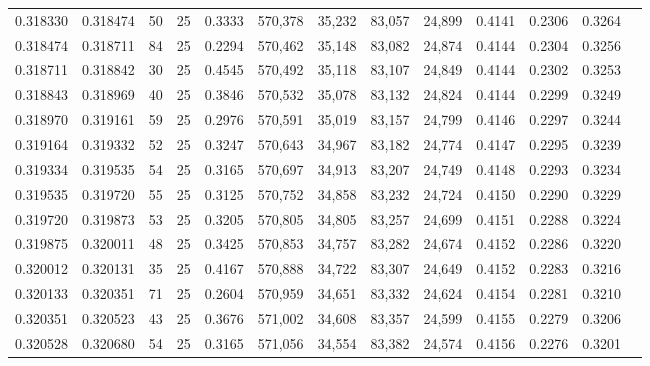 \begin{tabular}{rrrrrrrrrrrrr}
0.318330 & 0.318474 &    50 &  25 &                                     0.3333 & 570,378 &  35,232 &  83,057 &  24,899 & 0.4141 & 0.2306 & 0.3264 \\
0.318474 & 0.318711 &    84 &  25 &                                     0.2294 & 570,462 &  35,148 &  83,082 &  24,874 & 0.4144 & 0.2304 & 0.3256 \\
0.318711 & 0.318842 &    30 &  25 &                                     0.4545 & 570,492 &  35,118 &  83,107 &  24,849 & 0.4144 & 0.2302 & 0.3253 \\
0.318843 & 0.318969 &    40 &  25 &                                     0.3846 & 570,532 &  35,078 &  83,132 &  24,824 & 0.4144 & 0.2299 & 0.3249 \\
0.318970 & 0.319161 &    59 &  25 &                                     0.2976 & 570,591 &  35,019 &  83,157 &  24,799 & 0.4146 & 0.2297 & 0.3244 \\
0.319164 & 0.319332 &    52 &  25 &                                     0.3247 & 570,643 &  34,967 &  83,182 &  24,774 & 0.4147 & 0.2295 & 0.3239 \\
0.319334 & 0.319535 &    54 &  25 &                                     0.3165 & 570,697 &  34,913 &  83,207 &  24,749 & 0.4148 & 0.2293 & 0.3234 \\
0.319535 & 0.319720 &    55 &  25 &                                     0.3125 & 570,752 &  34,858 &  83,232 &  24,724 & 0.4150 & 0.2290 & 0.3229 \\
0.319720 & 0.319873 &    53 &  25 &                                     0.3205 & 570,805 &  34,805 &  83,257 &  24,699 & 0.4151 & 0.2288 & 0.3224 \\
0.319875 & 0.320011 &    48 &  25 &                                     0.3425 & 570,853 &  34,757 &  83,282 &  24,674 & 0.4152 & 0.2286 & 0.3220 \\
0.320012 & 0.320131 &    35 &  25 &                                     0.4167 & 570,888 &  34,722 &  83,307 &  24,649 & 0.4152 & 0.2283 & 0.3216 \\
0.320133 & 0.320351 &    71 &  25 &                                     0.2604 & 570,959 &  34,651 &  83,332 &  24,624 & 0.4154 & 0.2281 & 0.3210 \\
0.320351 & 0.320523 &    43 &  25 &                                     0.3676 & 571,002 &  34,608 &  83,357 &  24,599 & 0.4155 & 0.2279 & 0.3206 \\
0.320528 & 0.320680 &    54 &  25 &                                     0.3165 & 571,056 &  34,554 &  83,382 &  24,574 & 0.4156 & 0.2276 & 0.3201 \\

\end{tabular}
